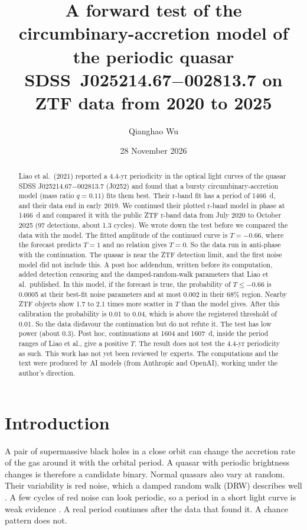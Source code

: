 \documentclass[11pt]{article}
\title{A forward test of the circumbinary-accretion model of the periodic quasar SDSS~J025214.67$-$002813.7 on ZTF data from 2020 to 2025}
\author{Qianghao Wu}
\date{28 November 2026}
\begin{document}
\maketitle

\begin{abstract}
\noindent Liao et al.\ (2021) reported a 4.4-yr periodicity in the optical light curves of the quasar SDSS J025214.67$-$002813.7 (J0252) and found that a bursty circumbinary-accretion model (mass ratio $q = 0.11$) fits them best. Their r-band fit has a period of 1466~d, and their data end in early 2019. We continued their plotted r-band model in phase at 1466~d and compared it with the public ZTF r-band data from July 2020 to October 2025 (97 detections, about 1.3 cycles). We wrote down the test before we compared the data with the model. The fitted amplitude of the continued curve is $T = -0.66$, where the forecast predicts $T = 1$ and no relation gives $T = 0$. So the data run in anti-phase with the continuation. The quasar is near the ZTF detection limit, and the first noise model did not include this. A post hoc addendum, written before its computation, added detection censoring and the damped-random-walk parameters that Liao et al.\ published. In this model, if the forecast is true, the probability of $T \le -0.66$ is 0.0005 at their best-fit noise parameters and at most 0.002 in their 68\% region. Nearby ZTF objects show 1.7 to 2.1 times more scatter in $T$ than the model gives. After this calibration the probability is 0.01 to 0.04, which is above the registered threshold of 0.01. So the data disfavour the continuation but do not refute it. The test has low power (about 0.3). Post hoc, continuations at 1604 and 1607~d, inside the period ranges of Liao et al., give a positive $T$. The result does not test the 4.4-yr periodicity as such. This work has not yet been reviewed by experts. The computations and the text were produced by AI models (from Anthropic and OpenAI), working under the author's direction.
\end{abstract}

\section{Introduction}

A pair of supermassive black holes in a close orbit can change the accretion rate of the gas around it with the orbital period. A quasar with periodic brightness changes is therefore a candidate binary. Normal quasars also vary at random. Their variability is red noise, which a damped random walk (DRW) describes well \cite{kelly2009}. A few cycles of red noise can look periodic, so a period in a short light curve is weak evidence \cite{vaughan2016}. A real period continues after the data that found it. A chance pattern does not.
\end{document}

